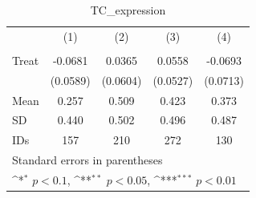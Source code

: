 \begin{table}[htbp]\centering
\def\sym#1{\ifmmode^{#1}\else\(^{#1}\)\fi}
\caption{TC\_expression}
\begin{tabular}{l*{4}{c}}
\hline\hline
                                &\multicolumn{1}{c}{(1)}&\multicolumn{1}{c}{(2)}&\multicolumn{1}{c}{(3)}&\multicolumn{1}{c}{(4)}\\
                                &\multicolumn{1}{c}{}&\multicolumn{1}{c}{}&\multicolumn{1}{c}{}&\multicolumn{1}{c}{}\\
\hline
Treat                           &  -0.0681         &   0.0365         &   0.0558         &  -0.0693         \\
                                & (0.0589)         & (0.0604)         & (0.0527)         & (0.0713)         \\
\hline
Mean                            &    0.257         &    0.509         &    0.423         &    0.373         \\
SD                              &    0.440         &    0.502         &    0.496         &    0.487         \\
IDs                             &      157         &      210         &      272         &      130         \\
\hline\hline
\multicolumn{5}{l}{\footnotesize Standard errors in parentheses}\\
\multicolumn{5}{l}{\footnotesize \sym{*} \(p<0.1\), \sym{**} \(p<0.05\), \sym{***} \(p<0.01\)}\\
\end{tabular}
\end{table}
